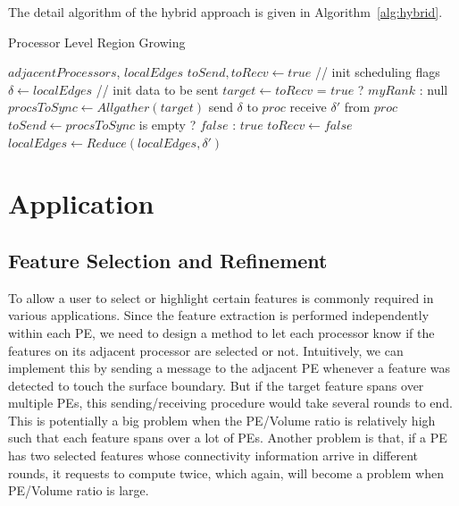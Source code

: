 \documentclass[10pt, conference, compsocconf]{IEEEtran}
\begin{document}
The detail algorithm of the hybrid approach is given in Algorithm~\ref{alg:hybrid}.
\begin{algorithm}
\caption{Processor Level Region Growing}
\label{alg:hybrid}
  \begin{algorithmic}[1]
  \REQUIRE $adjacentProcessors$, $localEdges$
  \STATE $toSend, toRecv \leftarrow true$ // init scheduling flags
  \STATE $\delta \leftarrow localEdges$ // init data to be sent
    \STATE $target \leftarrow toRecv$ = $true$ ? $myRank$ : null
    \STATE $procsToSync \leftarrow Allgather(target)$
        \STATE send $\delta$ to $proc$
      \ENDIF
        \STATE receive $\delta\prime$ from $proc$
      \ENDIF
    \ENDFOR
    \STATE $toSend \leftarrow procsToSync$ is empty ? $false$ : $true$
    \STATE $toRecv \leftarrow false$
    \STATE $localEdges \leftarrow Reduce(localEdges, \delta\prime)$
  \ENDWHILE
  \end{algorithmic}
\end{algorithm}

\section{Application}

\subsection{Feature Selection and Refinement}
To allow a user to select or highlight certain features is commonly required in various applications. 
Since the feature extraction is performed independently within each PE, 
we need to design a method to let each processor know if the features on its adjacent processor are selected or not.  
Intuitively, we can implement this by sending a message to the adjacent PE whenever a feature was detected to touch the surface boundary. But if the target feature spans over multiple PEs, this sending/receiving procedure would take several rounds to end. This is potentially a big problem when the PE/Volume ratio is relatively high such that each feature spans over a lot of PEs. Another problem is that, if a PE has two selected features whose connectivity information arrive in different rounds, it requests to compute twice, which again, will become a problem when PE/Volume ratio is large.
\end{document}
